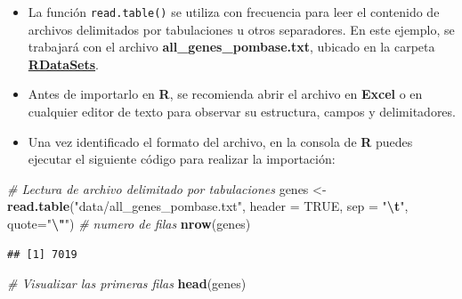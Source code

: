 \documentclass[
]{book}
\newenvironment{Shaded}{\begin{snugshade}}{\end{snugshade}}
\newcommand{\AttributeTok}[1]{\textcolor[rgb]{0.13,0.29,0.53}{#1}}
\newcommand{\CommentTok}[1]{\textcolor[rgb]{0.56,0.35,0.01}{\textit{#1}}}
\newcommand{\ConstantTok}[1]{\textcolor[rgb]{0.56,0.35,0.01}{#1}}
\newcommand{\FunctionTok}[1]{\textcolor[rgb]{0.13,0.29,0.53}{\textbf{#1}}}
\newcommand{\NormalTok}[1]{#1}
\newcommand{\OtherTok}[1]{\textcolor[rgb]{0.56,0.35,0.01}{#1}}
\newcommand{\SpecialCharTok}[1]{\textcolor[rgb]{0.81,0.36,0.00}{\textbf{#1}}}
\newcommand{\StringTok}[1]{\textcolor[rgb]{0.31,0.60,0.02}{#1}}
\begin{document}
\begin{itemize}
\item
  La función \texttt{read.table()} se utiliza con frecuencia para leer el contenido de archivos delimitados por tabulaciones u otros separadores. En este ejemplo, se trabajará con el archivo \textbf{all\_genes\_pombase.txt}, ubicado en la carpeta \textbf{\href{https://github.com/cdeoroaguado/Datos/blob/main/datarstudio/RDataSets.zip}{RDataSets}}.
\item
  Antes de importarlo en \textbf{R}, se recomienda abrir el archivo en \textbf{Excel} o en cualquier editor de texto para observar su estructura, campos y delimitadores.
\item
  Una vez identificado el formato del archivo, en la consola de \textbf{R} puedes ejecutar el siguiente código para realizar la importación:
\end{itemize}

\begin{Shaded}
\begin{Highlighting}[]
\CommentTok{\# Lectura de archivo delimitado por tabulaciones}
\NormalTok{genes }\OtherTok{\textless{}{-}} \FunctionTok{read.table}\NormalTok{(}\StringTok{"data/all\_genes\_pombase.txt"}\NormalTok{, }
                    \AttributeTok{header =} \ConstantTok{TRUE}\NormalTok{,       }
                    \AttributeTok{sep =} \StringTok{"}\SpecialCharTok{\textbackslash{}t}\StringTok{"}\NormalTok{,          }
                    \AttributeTok{quote=}\StringTok{"}\SpecialCharTok{\textbackslash{}"}\StringTok{"}\NormalTok{)  }
\CommentTok{\# numero de filas}
\FunctionTok{nrow}\NormalTok{(genes)}
\end{Highlighting}
\end{Shaded}

\begin{verbatim}
## [1] 7019
\end{verbatim}

\begin{Shaded}
\begin{Highlighting}[]
\CommentTok{\# Visualizar las primeras filas}
\FunctionTok{head}\NormalTok{(genes)}
\end{Highlighting}
\end{Shaded}
\end{document}
